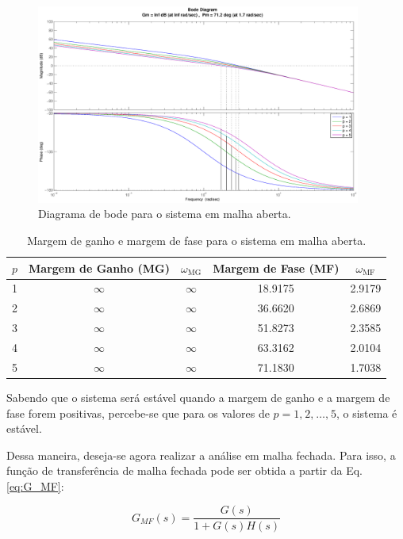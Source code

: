 \begin{figure}[htb]
\centering
    \includegraphics[width=0.95\textwidth]{imgs/questao1/bode_ma}
    \caption{Diagrama de bode para o sistema em malha aberta.}
    \label{fig:bode_ma}
\end{figure}

\begin{table}
\centering
    \caption{Margem de ganho e margem de fase para o sistema em malha aberta.}
    \label{tab:margem_ganho_fase_ma}
    \vspace{0.25cm}
\begin{tabular}{|c|c|c|c|c|}
\hline
$p$ & Margem de Ganho (MG) & $\omega_\text{MG}$ & 
Margem de Fase (MF) & $\omega_\text{MF}$\\
\hline
\hline
1 & $\infty$ & $\infty$ & 18.9175 & 2.9179\\
\hline
2 & $\infty$ & $\infty$ & 36.6620 & 2.6869\\
\hline
3 & $\infty$ & $\infty$ & 51.8273 & 2.3585\\
\hline
4 & $\infty$ & $\infty$ & 63.3162 & 2.0104\\
\hline
5 & $\infty$ & $\infty$ & 71.1830 & 1.7038\\
\hline
\end{tabular}
\end{table}

Sabendo que o sistema será estável quando a margem de ganho e a margem de fase
forem positivas, percebe-se que para os valores de $p = 1\text{,}\ 2\text{,}\ 
\ldots\text{,}\ 5$, o sistema é estável.

Dessa maneira, deseja-se agora realizar a análise em malha fechada. Para isso, a
função de transferência de malha fechada pode ser obtida a partir da Eq.
\ref{eq:G_MF}:

\begin{equation}\label{eq:G_MF}
G_{MF}(s) = \frac{G(s)}{1+G(s)H(s)}
\end{equation}


